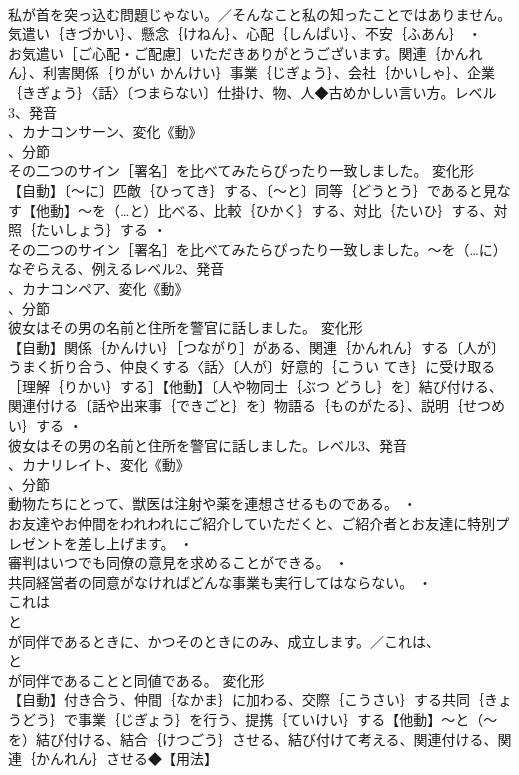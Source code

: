 \documentclass[8pt]{extreport}
\begin{document}
\begin{CJK}{UTF8}{min}
\\	私が首を突っ込む問題じゃない。／そんなこと私の知ったことではありません。気遣い｛きづかい｝、懸念｛けねん｝、心配｛しんぱい｝、不安｛ふあん｝ ・
\\	お気遣い［ご心配・ご配慮］いただきありがとうございます。関連｛かんれん｝、利害関係｛りがい かんけい｝事業｛じぎょう｝、会社｛かいしゃ｝、企業｛きぎょう｝〈話〉〔つまらない〕仕掛け、物、人◆古めかしい言い方。レベル3、発音
\\	、カナコンサーン、変化《動》
\\	、分節
\\	その二つのサイン［署名］を比べてみたらぴったり一致しました。	変化形 
\\	【自動】〔～に〕匹敵｛ひってき｝する、〔～と〕同等｛どうとう｝であると見なす【他動】～を（…と）比べる、比較｛ひかく｝する、対比｛たいひ｝する、対照｛たいしょう｝する ・
\\	その二つのサイン［署名］を比べてみたらぴったり一致しました。～を（…に）なぞらえる、例えるレベル2、発音
\\	、カナコンペア、変化《動》
\\	、分節
\\	彼女はその男の名前と住所を警官に話しました。	変化形 
\\	【自動】関係｛かんけい｝［つながり］がある、関連｛かんれん｝する〔人が〕うまく折り合う、仲良くする〈話〉〔人が〕好意的｛こうい てき｝に受け取る［理解｛りかい｝する］【他動】〔人や物同士｛ぶつ どうし｝を〕結び付ける、関連付ける〔話や出来事｛できごと｝を〕物語る｛ものがたる｝、説明｛せつめい｝する ・
\\	彼女はその男の名前と住所を警官に話しました。レベル3、発音
\\	、カナリレイト、変化《動》
\\	、分節
\\	動物たちにとって、獣医は注射や薬を連想させるものである。 ・
\\	お友達やお仲間をわれわれにご紹介していただくと、ご紹介者とお友達に特別プレゼントを差し上げます。 ・
\\	審判はいつでも同僚の意見を求めることができる。 ・
\\	共同経営者の同意がなければどんな事業も実行してはならない。 ・
\\	これは
\\	と
\\	が同伴であるときに、かつそのときにのみ、成立します。／これは、
\\	と
\\	が同伴であることと同値である。	変化形 
\\	【自動】付き合う、仲間｛なかま｝に加わる、交際｛こうさい｝する共同｛きょうどう｝で事業｛じぎょう｝を行う、提携｛ていけい｝する【他動】～と（～を）結び付ける、結合｛けつごう｝させる、結び付けて考える、関連付ける、関連｛かんれん｝させる◆【用法】

\end{CJK}
\end{document}
